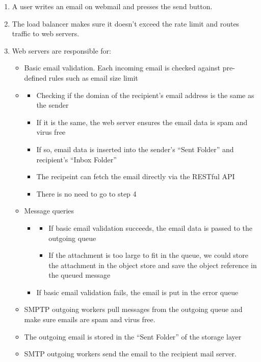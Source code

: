 \documentclass{report}
\theoremstyle{definition}
\begin{document}
\begin{enumerate}
\item
A user writes an email on webmail and presses the send button.
\item
The load balancer makes sure it doesn't exceed the rate limit and routes traffic to web servers.
\item
Web servers are responsible for:

\begin{itemize}
\item
Basic email validation. Each incoming email is checked against pre-defined rules such as email size limit
\item

\begin{itemize}
\item
Checking if the domian of the recipient's email address is the same as the sender
\item
If it is the same, the web server ensures the email data is spam and virus free
\item
If so, email data is inserted into the sender's ``Sent Folder'' and recipient's ``Inbox Folder''
\item
The recipeint can fetch the email directly via the RESTful API
\item
There is no need to go to step 4
\end{itemize}

\item

Message queries

\begin{itemize}
\item[4.1]

\begin{itemize}
\item
If basic email validation succeeds, the email data is passed to the outgoing queue
\item
If the attachment is too large to fit in the queue, we could store the attachment in the object store and save the object reference in the queued message
\end{itemize}

\item[4.2]
If basic email validation fails, the email is put in the error queue
\end{itemize}

\item
SMPTP outgoing workers pull messages from the outgoing queue and make sure emails are spam and virus free.
\item
The outgoing email is stored in the ``Sent Folder'' of the storage layer
\item
SMTP outgoing workers send the email to the recipient mail server.
\end{itemize}
\end{enumerate}
\end{document}
